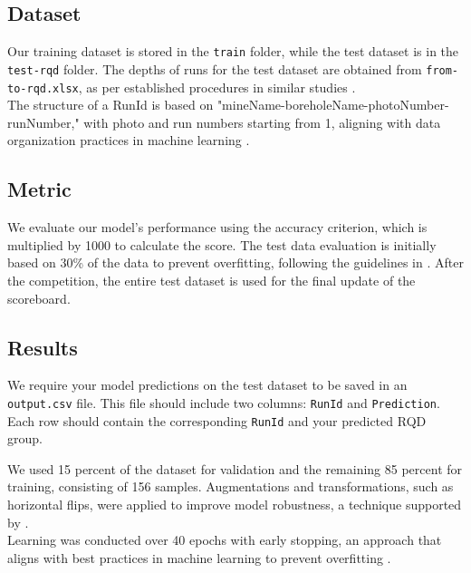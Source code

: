 \documentclass[sigconf,authordraft]{acmart}
\begin{document}
\subsection{Dataset}

Our training dataset is stored in the \texttt{train} folder, while the test dataset is in the \texttt{test-rqd} folder. The depths of runs for the test dataset are obtained from \texttt{from-to-rqd.xlsx}, as per established procedures in similar studies \cite{5,20,24}. \\

The structure of a RunId is based on "mineName-boreholeName-photoNumber-runNumber," with photo and run numbers starting from 1, aligning with data organization practices in machine learning \cite{11,14,16}. \\

\subsection{Metric}

We evaluate our model's performance using the accuracy criterion, which is multiplied by 1000 to calculate the score. The test data evaluation is initially based on 30\% of the data to prevent overfitting, following the guidelines in \cite{25,27,29}. After the competition, the entire test dataset is used for the final update of the scoreboard. \\

\subsection{Results}

We require your model predictions on the test dataset to be saved in an \texttt{output.csv} file. This file should include two columns: \texttt{RunId} and \texttt{Prediction}. Each row should contain the corresponding \texttt{RunId} and your predicted RQD group.

We used 15 percent of the dataset for validation and the remaining 85 percent for training, consisting of 156 samples. Augmentations and transformations, such as horizontal flips, were applied to improve model robustness, a technique supported by \cite{10,13,15}. \\

Learning was conducted over 40 epochs with early stopping, an approach that aligns with best practices in machine learning to prevent overfitting \cite{25,27,29}. \\
\end{document}

